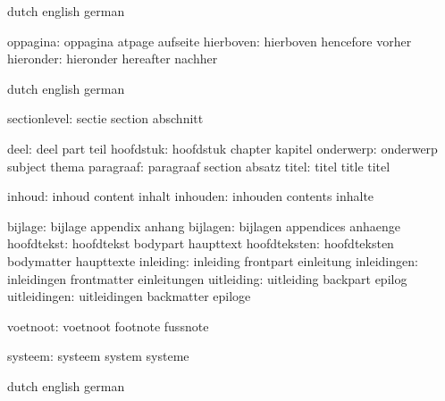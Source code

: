 \stopvariables


\startvariables  dutch       english     german

      oppagina:  oppagina    atpage      aufseite
     hierboven:  hierboven   hencefore   vorher
     hieronder:  hieronder   hereafter   nachher

\stopvariables




\startvariables       dutch                english             german

       sectionlevel:  sectie               section             abschnitt

               deel:  deel                 part                teil
          hoofdstuk:  hoofdstuk            chapter             kapitel
          onderwerp:  onderwerp            subject             thema
          paragraaf:  paragraaf            section             absatz
              titel:  titel                title               titel

             inhoud:  inhoud               content             inhalt
           inhouden:  inhouden             contents            inhalte

            bijlage:  bijlage              appendix            anhang
           bijlagen:  bijlagen             appendices          anhaenge
         hoofdtekst:  hoofdtekst           bodypart            haupttext
       hoofdteksten:  hoofdteksten         bodymatter          haupttexte
          inleiding:  inleiding            frontpart           einleitung
        inleidingen:  inleidingen          frontmatter         einleitungen
         uitleiding:  uitleiding           backpart            epilog
       uitleidingen:  uitleidingen         backmatter          epiloge

           voetnoot:  voetnoot             footnote            fussnote

            systeem:  systeem              system              systeme

\stopvariables

\startvariables       dutch                english             german

